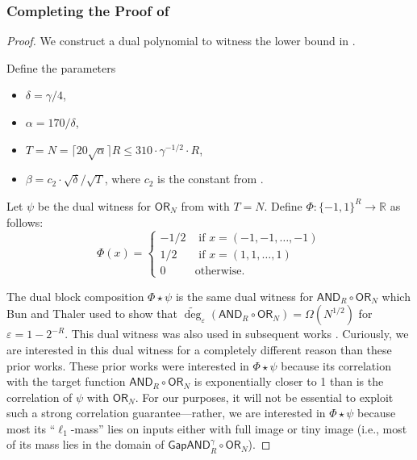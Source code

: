 \documentclass[11pt, letterpaper, fleqn]{article}
\theoremstyle{plain}
\newcommand{\reals}{\mathbb{R}}
\newcommand{\OR}{\mathsf{ OR}}
\newcommand{\bits}{\{-1,1\}}
\newcommand{\ls}{\star}
\newcommand{\eps}{\varepsilon}
\newcommand{\adeg}{\widetilde{\operatorname{deg}}}
\newcommand{\AND}{\mathsf{AND}}
\newcommand{\GAPAND}{\mathsf{GapAND}}
\begin{document}
\subsubsection{Completing the Proof of } \label{sec:ughsection}
\begin{proof}
We construct a dual polynomial to witness the lower bound in .

Define the parameters
\begin{itemize}
\item  $\delta = \gamma/4$, 
\item $\alpha = 170/\delta$, 
\item $T=N=\lceil 20 \sqrt{\alpha} \rceil R \leq 310 \cdot \gamma^{-1/2} \cdot R$,
\item $\beta = c_2 \cdot \sqrt{\delta} / \sqrt{T}$, where $c_2$ is the constant from .
\end{itemize}

Let 
$\psi$ be the dual witness for $\OR_N$ from  with $T=N$. Define $\Phi \colon \bits^R \to \reals$ as follows:
$$\Phi(x) = \begin{cases}
-1/2 & \text{ if } x=(-1, -1, \dots, -1)\\
1/2 & \text{ if } x = (1, 1, \dots, 1)\\
0 & \text{otherwise}.
\end{cases}$$

The dual block composition $\Phi \ls \psi$ is the same dual witness for $\AND_R \circ \OR_N$ which Bun and Thaler \cite{bt14} used to show that $\adeg_{\eps}(\AND_R \circ
\OR_N) = \Omega(N^{1/2})$ for $\eps = 1-2^{-R}$. This dual witness was also
used in subsequent works \cite{sherstov14, bchtv}. Curiously, we are
interested in this dual witness for a completely different reason than these
prior works. These prior works were interested in $\Phi \ls \psi$ because its correlation
with the target function $\AND_R \circ \OR_N$ is exponentially closer to 1
than is the correlation of $\psi$ with $\OR_N$. For our purposes,
it will not be essential to exploit such a strong correlation guarantee---rather, we are
interested in $\Phi \ls \psi$ because most its ``$\ell_1$-mass''
lies on inputs either with full image or tiny image (i.e.,
most of its mass lies in the domain of $\GAPAND_{R}^{\gamma} \circ \OR_N$).


\end{proof}
\end{document}
